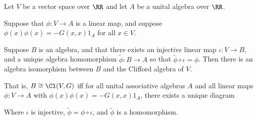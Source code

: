 \begin{thm}
    Let $V$ be a vector space over $\RR$ and let $A$ be a unital algebra over $\RR$. 

    Suppose that $\phi : V \to A$ is a linear map, and suppose $\phi(x)\phi(x) = -G(x,x)1_A$ for all $x \in V$.

    Suppose $B$ is an algebra, and that there exists an injective linear map $\iota : V \to B$, and a unique algebra homomorphism $\tilde{\phi}:B\to A$ so that $\tilde{\phi}\circ\iota =\phi$. Then there is an algebra isomorphism between $B$ and the Clifford algebra of $V$.

    That is, $B\cong \Cl(V,G)$ iff for all unital associative algebras $A$ and all linear maps $\phi : V\to A$ with $\phi(x)\phi(x)=-G(x,x)1_A$, there exists a unique diagram
    \begin{center}
    \end{center}
    Where $\iota$ is injective, $\tilde{\phi} = \phi\circ\iota$, and $\tilde{\phi}$ is a homomorphism.
\end{thm}
